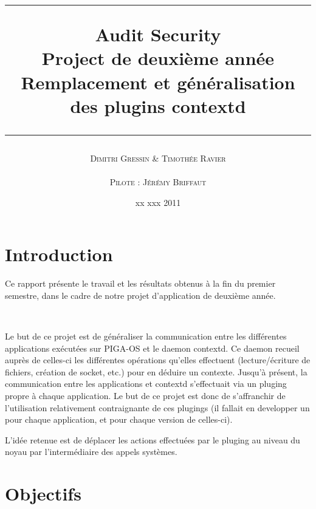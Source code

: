 \documentclass[pdftex,a4paper,titlepage,11pt,openright]{article}
\newcommand{\nom}[1]{\textsc{#1}}
\newcommand{\ligne}[1][1pt]{
  \par\noindent
  \rule[.5ex]{\linewidth}{#1}\par}
\newcommand{\clearemptydoublepage}{
	\newpage{\pagestyle{empty}\cleardoublepage}}
\begin{document}
\setlength{\parskip}{2.4ex}

\title{
\ligne{\Large}
\textbf{Audit Security}\\
\textbf{Project de deuxième année}\\
\Large Remplacement et généralisation des plugins contextd
\ligne{\Large}
}
\author{\nom{Dimitri Gressin} \& \nom{Timothée Ravier}\\\\\nom{Pilote : Jérémy Briffaut}}
\date{xx xxx 2011} %

\maketitle

\clearemptydoublepage

\setcounter{secnumdepth}{2}
\setcounter{tocdepth}{2}
\tableofcontents
\addtocounter{page}{-1}

\newpage

\section*{Introduction} 
Ce rapport présente le travail et les résultats obtenus à la fin du premier semestre, dans le cadre de notre projet d'application de deuxième année.

~

Le but de ce projet est de généraliser la communication entre les différentes applications exécutées sur PIGA-OS et le daemon contextd. 
Ce daemon recueil auprès de celles-ci les différentes opérations qu'elles effectuent (lecture/écriture de fichiers, création de socket, etc.) pour en déduire un contexte.
Jusqu'à présent, la communication entre les applications et contextd s'effectuait via un pluging propre à chaque application. Le but de ce projet est donc de s'affranchir de l'utilisation relativement contraignante de ces plugings (il fallait en developper un pour chaque application, et pour chaque version de celles-ci). 

L'idée retenue est de déplacer les actions effectuées par le pluging au niveau du noyau par l'intermédiaire des appels systèmes.


\newpage

\section{Objectifs}
\end{document}
